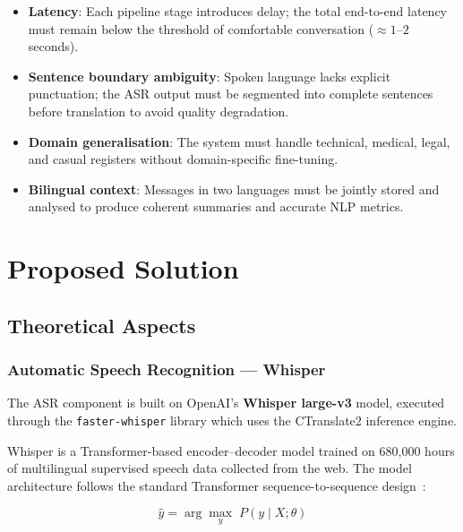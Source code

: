 \documentclass[12pt,a4paper]{report}
\begin{document}
\begin{itemize}
  \item \textbf{Latency}: Each pipeline stage introduces delay; the
        total end-to-end latency must remain below the threshold of
        comfortable conversation ($\approx 1$--$2$ seconds).
  \item \textbf{Sentence boundary ambiguity}: Spoken language lacks
        explicit punctuation; the ASR output must be segmented into
        complete sentences before translation to avoid quality
        degradation.
  \item \textbf{Domain generalisation}: The system must handle
        technical, medical, legal, and casual registers without
        domain-specific fine-tuning.
  \item \textbf{Bilingual context}: Messages in two languages must be
        jointly stored and analysed to produce coherent summaries and
        accurate NLP metrics.
\end{itemize}

\chapter{Proposed Solution}

\section{Theoretical Aspects}

\subsection{Automatic Speech Recognition — Whisper}

The ASR component is built on OpenAI's \textbf{Whisper large-v3} model,
executed through the \texttt{faster-whisper} library which uses the
CTranslate2 inference engine.

Whisper is a Transformer-based encoder--decoder model trained on
680{,}000 hours of multilingual supervised speech data collected from
the web. The model architecture follows the standard Transformer
sequence-to-sequence design~\cite{vaswani2017attention}:

\begin{equation}
  \hat{y} = \arg\max_{y} \; P(y \mid X; \theta)
\end{equation}
\end{document}

